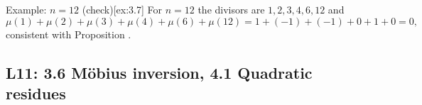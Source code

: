 \documentclass[10pt]{article}
\theoremstyle{definition}
\theoremstyle{plain}
\numberwithin{equation}{section}
\begin{document}
\begin{define}{Example: $n=12$ (check)}[ex:3.7]
For $n=12$ the divisors are $1,2,3,4,6,12$ and
\[
\mu(1)+\mu(2)+\mu(3)+\mu(4)+\mu(6)+\mu(12)
=1+(-1)+(-1)+0+1+0=0,
\]
consistent with Proposition .
\end{define}
















\newpage
\subsection{L11: 3.6 Möbius inversion, 4.1 Quadratic residues}

\end{document}
